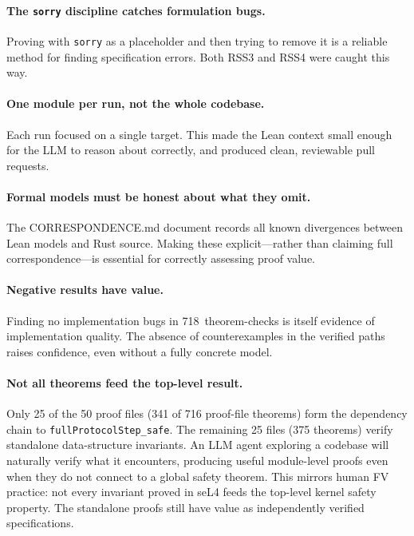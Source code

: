 \documentclass[sigconf,10pt]{acmart}
\begin{document}
\paragraph{The \texttt{sorry} discipline catches formulation bugs.}
Proving with \texttt{sorry} as a placeholder and then trying to remove it
is a reliable method for finding specification errors.  Both RSS3 and RSS4
were caught this way.

\paragraph{One module per run, not the whole codebase.}
Each run focused on a single target.  This made the Lean context small
enough for the LLM to reason about correctly, and produced clean,
reviewable pull requests.

\paragraph{Formal models must be honest about what they omit.}
The CORRESPONDENCE.md document records all known divergences between
Lean models and Rust source.  Making these explicit---rather than
claiming full correspondence---is essential for correctly assessing
proof value.

\paragraph{Negative results have value.}
Finding no implementation bugs in 718~theorem-checks is itself evidence
of implementation quality.  The absence of counterexamples in the
verified paths raises confidence, even without a fully concrete model.

\paragraph{Not all theorems feed the top-level result.}
Only 25 of the 50 proof files (341 of 716 proof-file theorems) form the
dependency chain to \texttt{fullProtocolStep\_safe}.  The remaining 25
files (375 theorems) verify standalone data-structure invariants.  An
LLM agent exploring a codebase will naturally verify what it encounters,
producing useful module-level proofs even when they do not connect to
a global safety theorem.  This mirrors human FV practice:
not every invariant proved in seL4 feeds the top-level kernel safety
property.  The standalone proofs still have value as independently
verified specifications.
\end{document}

